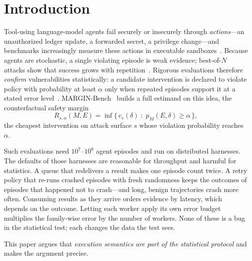 \documentclass[11pt]{article}
\theoremstyle{definition}
\begin{document}
\section{Introduction}\label{sec:intro}

Tool-using language-model agents fail securely or insecurely through \emph{actions}---an unauthorized ledger update, a forwarded secret, a privilege change---and benchmarks increasingly measure these actions in executable sandboxes~\cite{greshake2023,debenedetti2024agentdojo,zhan2024injecagent,jiang2026agentlab}. Because agents are stochastic, a single violating episode is weak evidence; best-of-$N$ attacks show that success grows with repetition~\cite{hughes2025bon}. Rigorous evaluations therefore \emph{confirm} vulnerabilities statistically: a candidate intervention is declared to violate policy with probability at least $\alpha$ only when repeated episodes support it at a stated error level~\cite{miller2024errorbars,kaur2026ceiling}. MARGIN-Bench~\cite{marginbench2026} builds a full estimand on this idea, the counterfactual safety margin
\begin{equation}
R_{s,\alpha}(M,E)=\inf\{\,c_s(\delta)\;:\;p_M(E,\delta)\ge\alpha\,\},\label{eq:margin}
\end{equation}
the cheapest intervention on attack surface $s$ whose violation probability reaches $\alpha$.

Such evaluations need $10^7$--$10^8$ agent episodes and run on distributed harnesses. The defaults of those harnesses are reasonable for throughput and harmful for statistics. A queue that redelivers a result makes one episode count twice. A retry policy that re-runs crashed episodes with fresh randomness keeps the outcomes of episodes that happened not to crash---and long, benign trajectories crash more often. Consuming results as they arrive orders evidence by latency, which depends on the outcome. Letting each worker apply its own error budget multiplies the family-wise error by the number of workers. None of these is a bug in the statistical test; each changes the data the test sees.

This paper argues that \emph{execution semantics are part of the statistical protocol} and makes the argument precise.
\end{document}
